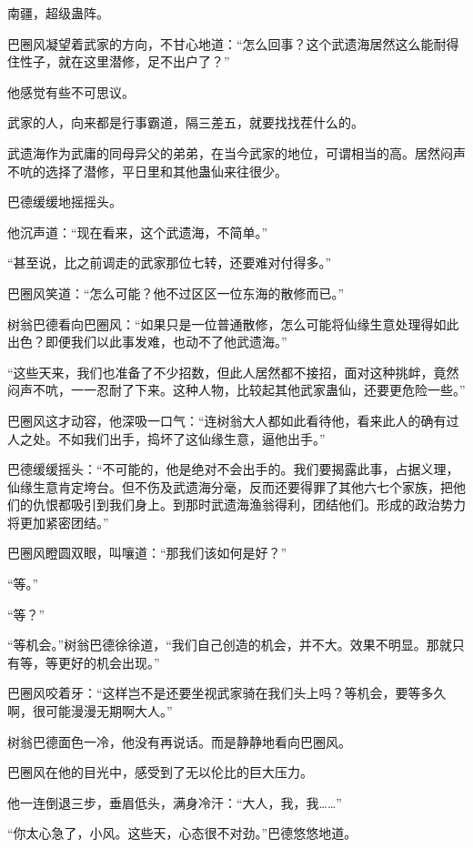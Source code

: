 
\begin{this_body}

南疆，超级蛊阵。

巴圈风凝望着武家的方向，不甘心地道：“怎么回事？这个武遗海居然这么能耐得住性子，就在这里潜修，足不出户了？”

他感觉有些不可思议。

武家的人，向来都是行事霸道，隔三差五，就要找找茬什么的。

武遗海作为武庸的同母异父的弟弟，在当今武家的地位，可谓相当的高。居然闷声不吭的选择了潜修，平日里和其他蛊仙来往很少。

巴德缓缓地摇摇头。

他沉声道：“现在看来，这个武遗海，不简单。”

“甚至说，比之前调走的武家那位七转，还要难对付得多。”

巴圈风笑道：“怎么可能？他不过区区一位东海的散修而已。”

树翁巴德看向巴圈风：“如果只是一位普通散修，怎么可能将仙缘生意处理得如此出色？即便我们以此事发难，也动不了他武遗海。”

“这些天来，我们也准备了不少招数，但此人居然都不接招，面对这种挑衅，竟然闷声不吭，一一忍耐了下来。这种人物，比较起其他武家蛊仙，还要更危险一些。”

巴圈风这才动容，他深吸一口气：“连树翁大人都如此看待他，看来此人的确有过人之处。不如我们出手，捣坏了这仙缘生意，逼他出手。”

巴德缓缓摇头：“不可能的，他是绝对不会出手的。我们要揭露此事，占据义理，仙缘生意肯定垮台。但不伤及武遗海分毫，反而还要得罪了其他六七个家族，把他们的仇恨都吸引到我们身上。到那时武遗海渔翁得利，团结他们。形成的政治势力将更加紧密团结。”

巴圈风瞪圆双眼，叫嚷道：“那我们该如何是好？”

“等。”

“等？”

“等机会。”树翁巴德徐徐道，“我们自己创造的机会，并不大。效果不明显。那就只有等，等更好的机会出现。”

巴圈风咬着牙：“这样岂不是还要坐视武家骑在我们头上吗？等机会，要等多久啊，很可能漫漫无期啊大人。”

树翁巴德面色一冷，他没有再说话。而是静静地看向巴圈风。

巴圈风在他的目光中，感受到了无以伦比的巨大压力。

他一连倒退三步，垂眉低头，满身冷汗：“大人，我，我……”

“你太心急了，小风。这些天，心态很不对劲。”巴德悠悠地道。


\end{this_body}
